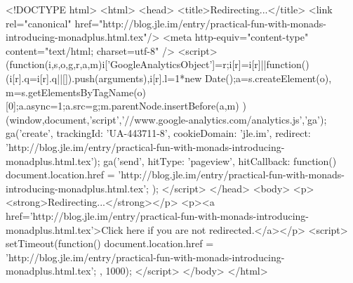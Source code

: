 <!DOCTYPE html>
<html>
<head>
<title>Redirecting...</title>
<link rel="canonical" href="http://blog.jle.im/entry/practical-fun-with-monads-introducing-monadplus.html.tex"/>
<meta http-equiv="content-type" content="text/html; charset=utf-8" />
<script>
(function(i,s,o,g,r,a,m){i['GoogleAnalyticsObject']=r;i[r]=i[r]||function(){
(i[r].q=i[r].q||[]).push(arguments)},i[r].l=1*new Date();a=s.createElement(o),
m=s.getElementsByTagName(o)[0];a.async=1;a.src=g;m.parentNode.insertBefore(a,m)
})(window,document,'script','//www.google-analytics.com/analytics.js','ga');
ga('create', { trackingId: 'UA-443711-8', cookieDomain: 'jle.im', redirect: 'http://blog.jle.im/entry/practical-fun-with-monads-introducing-monadplus.html.tex'});
ga('send', { hitType: 'pageview', hitCallback: function() { document.location.href = 'http://blog.jle.im/entry/practical-fun-with-monads-introducing-monadplus.html.tex'; } });
</script>
</head>
<body>
  <p><strong>Redirecting...</strong></p>
  <p><a href='http://blog.jle.im/entry/practical-fun-with-monads-introducing-monadplus.html.tex'>Click here if you are not redirected.</a></p>
  <script>
    setTimeout(function() { document.location.href = 'http://blog.jle.im/entry/practical-fun-with-monads-introducing-monadplus.html.tex'; }, 1000);
  </script>
</body>
</html>
